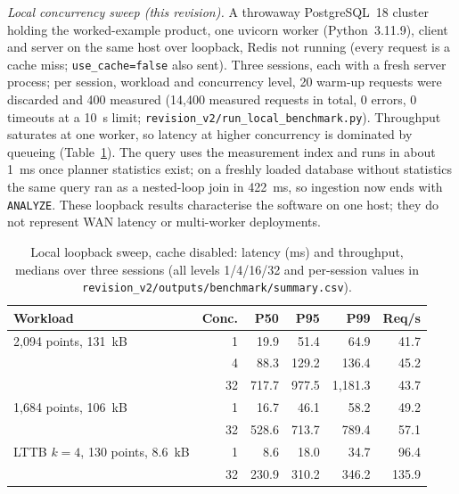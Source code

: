 \documentclass[10pt,a4paper]{article}
\begin{document}
\textit{Local concurrency sweep (this revision).} A throwaway PostgreSQL~18 cluster holding the worked-example product, one uvicorn worker (Python~3.11.9), client and server on the same host over loopback, Redis not running (every request is a cache miss; \texttt{use\_cache=false} also sent). Three sessions, each with a fresh server process; per session, workload and concurrency level, 20 warm-up requests were discarded and 400 measured (14,400 measured requests in total, 0 errors, 0 timeouts at a 10~s limit; \texttt{revision\_v2/run\_local\_benchmark.py}). Throughput saturates at one worker, so latency at higher concurrency is dominated by queueing (Table~\ref{table:performance}). The query uses the measurement index and runs in about 1~ms once planner statistics exist; on a freshly loaded database without statistics the same query ran as a nested-loop join in 422~ms, so ingestion now ends with \texttt{ANALYZE}. These loopback results characterise the software on one host; they do not represent WAN latency or multi-worker deployments.

\begin{table}[htbp]
\centering
\footnotesize
\setlength{\tabcolsep}{2.5pt}
\begin{tabular}{@{}lrrrrr@{}}
\toprule
\textbf{Workload} & \textbf{Conc.} & \textbf{P50} & \textbf{P95} & \textbf{P99} & \textbf{Req/s} \\
\midrule
2,094 points, 131~kB & 1  & 19.9  & 51.4  & 64.9    & 41.7 \\
                     & 4  & 88.3  & 129.2 & 136.4   & 45.2 \\
                     & 32 & 717.7 & 977.5 & 1,181.3 & 43.7 \\
1,684 points, 106~kB & 1  & 16.7  & 46.1  & 58.2    & 49.2 \\
                     & 32 & 528.6 & 713.7 & 789.4   & 57.1 \\
LTTB $k{=}4$, 130 points, 8.6~kB & 1  & 8.6   & 18.0  & 34.7  & 96.4 \\
                                 & 32 & 230.9 & 310.2 & 346.2 & 135.9 \\
\bottomrule
\end{tabular}
\caption{Local loopback sweep, cache disabled: latency (ms) and throughput, medians over three sessions (all levels 1/4/16/32 and per-session values in \texttt{revision\_v2/outputs/benchmark/summary.csv}).}
\label{table:performance}
\end{table}
\end{document}
